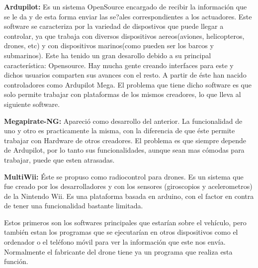 \documentclass{article}
\begin{document}
\hspace{1 cm} \textbf{Ardupilot:} Es un sistema OpenSource encargado de recibir la informaci\'on que se le da y de esta forma enviar las se?ales correspondientes a los actuadores. Este software se caracteriza por la variedad de dispostivos que puede llegar a controlar, ya que trabaja con diversos dispositivos aereos(aviones, helicopteros, drones, etc) y con dispositivos marinos(como pueden ser los barcos y submarinos). Este ha tenido un gran desarollo debido a su principal caracter\'istica: Opensource. Hay mucha gente creando interfaces para este y dichos usuarios comparten sus avances con el resto. A partir de \'este han nacido controladores como Ardupilot Mega. El problema que tiene dicho software es que solo permite trabajar con plataformas de los mismos creadores, lo que lleva al siguiente software.

\hspace{1 cm} \textbf{Megapirate-NG:} Apareci\'o como desarrollo del anterior. La funcionalidad de uno y otro es practicamente la misma, con la diferencia de que \'este permite trabajar con Hardware de otros creadores. El problema es que siempre depende de Ardupilot, por lo tanto sus funcionalidades, aunque sean mas c\'omodas para trabajar, puede que esten atrasadas.

\hspace{1 cm} \textbf{MultiWii:} \'Este se propuso como radiocontrol para drones. Es un sistema que fue creado por los desarrolladores y con los sensores (giroscopios y acelerometros) de la Nintendo Wii. Es una plataforma basada en arduino, con el factor en contra de tener una funcionalidad bastante limitada. 

Estos primeros son los softwares principales que estar\'ian sobre el veh\'iculo, pero tambi\'en estan los programas que se ejecutar\'ian en otros dispositivos como el ordenador o el tel\'efono m\'ovil para ver la informaci\'on que este nos env\'ia. Normalmente el fabricante del drone tiene ya un programa que realiza esta funci\'on. 
\end{document}
